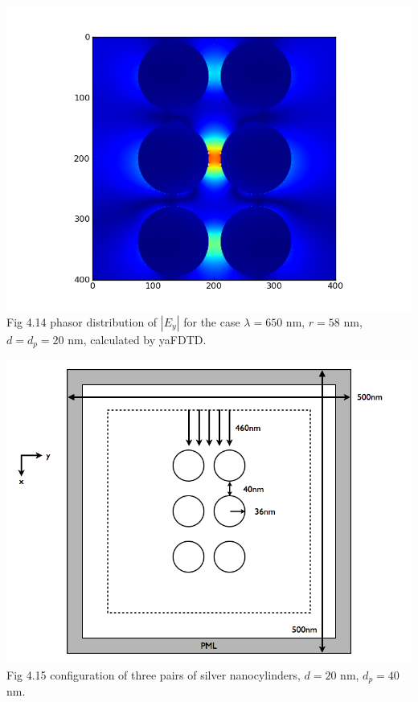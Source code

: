 \documentclass[openany]{book}
\begin{document}
\begin{center}
\includegraphics[scale=0.8]{images/ey-r58.png}\\
Fig 4.14
phasor distribution of $|E_y|$ for the case $\lambda = 650$ nm, $r = 58$ nm, $d = d_p = 20$ nm, calculated by yaFDTD.
\end{center}


\begin{center}
\includegraphics[scale=0.5]{images/open-cavity-config-d40.png}\\
Fig 4.15
configuration of three pairs of silver nanocylinders, $d = 20$ nm, $d_p = 40$ nm.
\end{center}
\end{document}
